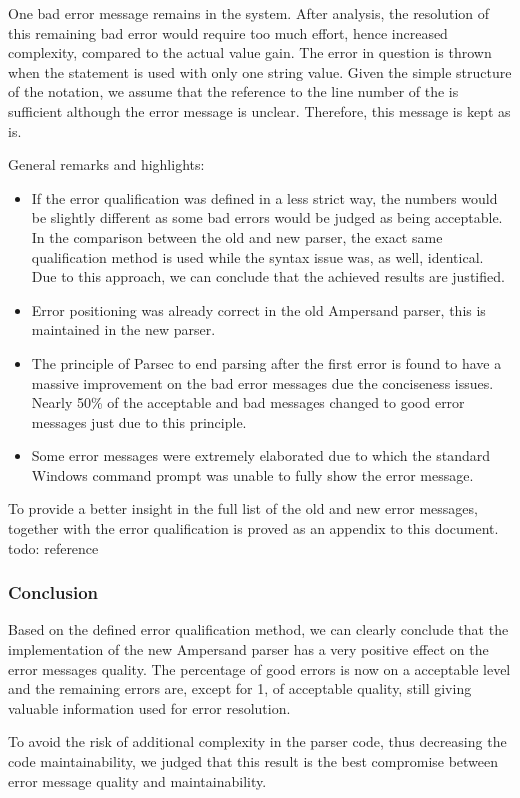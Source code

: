 One bad error message remains in the system.
After analysis, the resolution of this remaining bad error would require too much effort, hence increased complexity, compared to the actual value gain.
The error in question is thrown when the  statement is used with only one string value. 
Given the simple structure of the notation, we assume that the reference to the line number of the  is sufficient although the error message is unclear.
Therefore, this message is kept as is.

General remarks and highlights:
 \begin{itemize}
	\item 	If the error qualification was defined in a less strict way, the numbers would be slightly different as some bad errors would be judged as being acceptable. 
		In the comparison between the old and new parser, the exact same qualification method is used while the syntax issue was, as well, identical.
		Due to this approach, we can conclude that the achieved results are justified.
	\item 	Error positioning was already correct in the old Ampersand parser, this is maintained in the new parser.
	\item 	The principle of Parsec to end parsing after the first error is found to have a massive improvement on the bad error messages due the conciseness issues.
		Nearly 50\% of the acceptable and bad messages changed to good error messages just due to this principle.
	\item 	Some error messages were extremely elaborated due to which the standard Windows command prompt was unable to fully show the error message.
\end {itemize}

To provide a better insight in the full list of the old and new error messages, together with the error qualification is proved as an appendix to this document.
todo: reference

\subsubsection{Conclusion}
Based on the defined error qualification method, we can clearly conclude that the implementation of the new Ampersand parser has a very positive effect on the error messages quality.
The percentage of good errors is now on a acceptable  level and the remaining errors are, except for 1, of acceptable quality, still giving valuable information used for error resolution.

To avoid the risk of additional complexity in the parser code, thus decreasing the code maintainability, we judged that this result is  the best compromise between error message quality and maintainability.
